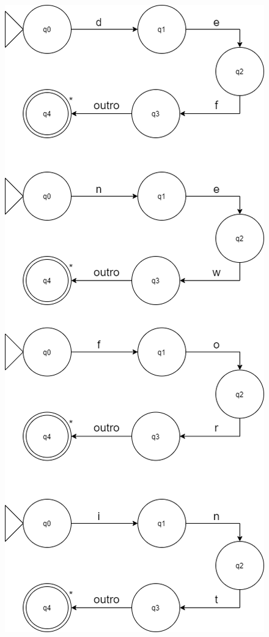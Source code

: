 \documentclass[
	12pt,				%
	openright,			%
	twoside,			%
	a4paper,			%
	english,			%
	french,				%
	spanish,			%
	brazil				%
	]{abntex2}
\begin{document}
\includegraphics[scale=0.7]{6.png}
\\
\end{document}
